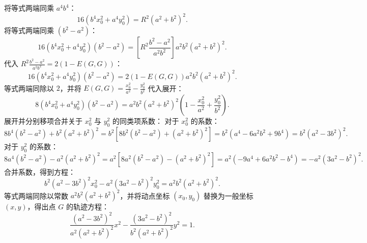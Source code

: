 \begin{solution}
将等式两端同乘 $a^4 b^4$：
\[ 16(b^4 x_0^2 + a^4 y_0^2) = R^2 (a^2 + b^2)^2. \]
将等式两端同乘 $(b^2 - a^2)$：
\[ 16(b^4 x_0^2 + a^4 y_0^2)(b^2 - a^2) = \left[ R^2 \frac{b^2 - a^2}{a^2 b^2} \right] a^2 b^2 (a^2 + b^2)^2. \]
代入 $R^2 \frac{b^2 - a^2}{a^2 b^2} = 2(1 - E(G, G))$：
\[ 16(b^4 x_0^2 + a^4 y_0^2)(b^2 - a^2) = 2(1 - E(G, G)) a^2 b^2 (a^2 + b^2)^2. \]
等式两端同除以 $2$，并将 $E(G, G) = \frac{x_0^2}{a^2} - \frac{y_0^2}{b^2}$ 代入展开：
\[ 8(b^4 x_0^2 + a^4 y_0^2)(b^2 - a^2) = a^2 b^2 (a^2 + b^2)^2 \left(1 - \frac{x_0^2}{a^2} + \frac{y_0^2}{b^2}\right). \]
展开并分别移项合并关于 $x_0^2$ 与 $y_0^2$ 的同类项系数：
对于 $x_0^2$ 的系数：
\[ 8b^4(b^2 - a^2) + b^2 (a^2 + b^2)^2 = b^2 \left[ 8b^2(b^2 - a^2) + (a^2 + b^2)^2 \right] = b^2(a^4 - 6a^2 b^2 + 9b^4) = b^2(a^2 - 3b^2)^2. \]
对于 $y_0^2$ 的系数：
\[ 8a^4(b^2 - a^2) - a^2 (a^2 + b^2)^2 = a^2 \left[ 8a^2(b^2 - a^2) - (a^2 + b^2)^2 \right] = a^2(-9a^4 + 6a^2 b^2 - b^4) = -a^2(3a^2 - b^2)^2. \]
合并系数，得到方程：
\[ b^2(a^2 - 3b^2)^2 x_0^2 - a^2(3a^2 - b^2)^2 y_0^2 = a^2 b^2 (a^2 + b^2)^2. \]
等式两端同除以常数 $a^2 b^2 (a^2 + b^2)^2$，并将动点坐标 $(x_0, y_0)$ 替换为一般坐标 $(x, y)$，得出点 $G$ 的轨迹方程：
\[ \frac{(a^2 - 3b^2)^2}{a^2 (a^2 + b^2)^2} x^2 - \frac{(3a^2 - b^2)^2}{b^2 (a^2 + b^2)^2} y^2 = 1. \]

\end{solution}



